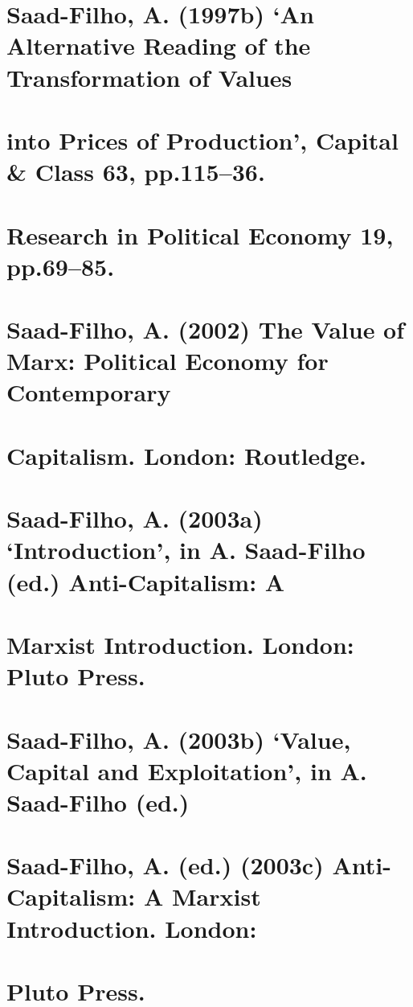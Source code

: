 \section{Saad-Filho, A. (1997b) ‘An Alternative Reading of the Transformation of Values}


\section{into Prices of Production’, Capital & Class 63, pp.115–36.}


\section{Research in Political Economy 19, pp.69–85.}


\section{Saad-Filho, A. (2002) The Value of Marx: Political Economy for Contemporary}


\section{Capitalism. London: Routledge.}


\section{Saad-Filho, A. (2003a) ‘Introduction’, in A. Saad-Filho (ed.) Anti-Capitalism: A}


\section{Marxist Introduction. London: Pluto Press.}


\section{Saad-Filho, A. (2003b) ‘Value, Capital and Exploitation’, in A. Saad-Filho (ed.)}


\section{Saad-Filho, A. (ed.) (2003c) Anti-Capitalism: A Marxist Introduction. London:}


\section{Pluto Press.}


